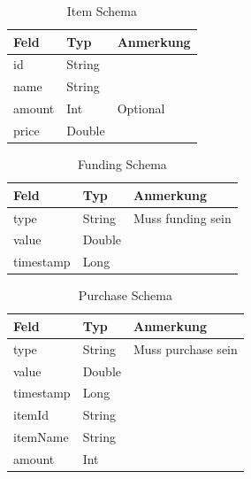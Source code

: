 \documentclass[a4paper, 11pt]{article}
\begin{document}
\begin{table}[H]
	\centering
	\begin{tabular}{@{}lll@{}}
		Feld   & Typ    & Anmerkung \\ \toprule
		id     & String &           \\ \midrule
		name   & String &           \\ \midrule
		amount & Int    & Optional  \\ \midrule
		price  & Double &           \\ \bottomrule
	\end{tabular}
	\caption{Item Schema}
	\label{tab:attachements:item}
\end{table}

\begin{table}[H]
	\centering
	\begin{tabular}{@{}lll@{}}
		Feld      & Typ    & Anmerkung                      \\ \toprule
		type      & String & Muss \glqq funding\grqq{} sein \\ \midrule
		value     & Double &                                \\ \midrule
		timestamp & Long   &                                \\ \bottomrule
	\end{tabular}
	\caption{Funding Schema}
	\label{tab:attachements:funding}
\end{table}

\begin{table}[H]
	\centering
	\begin{tabular}{@{}lll@{}}
		Feld      & Typ    & Anmerkung                       \\ \toprule
		type      & String & Muss \glqq purchase\grqq{} sein \\ \midrule
		value     & Double &                                 \\ \midrule
		timestamp & Long   &                                 \\ \midrule
		itemId    & String &                                 \\ \midrule
		itemName  & String &                                 \\ \midrule
		amount    & Int    &                                 \\ \bottomrule
	\end{tabular}
	\caption{Purchase Schema}
	\label{tab:attachements:purchase}
\end{table}
\end{document}
